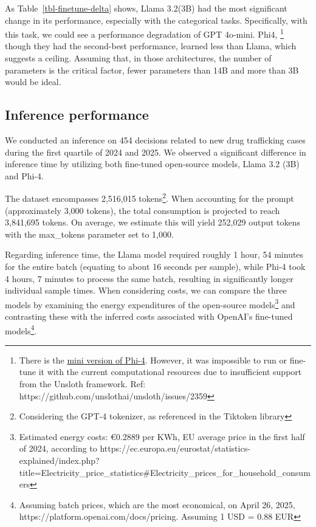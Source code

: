 \documentclass[
  12pt,
]{article}
\begin{document}
As Table~\ref{tbl-finetune-delta} shows, Llama 3.2(3B) had the most
significant change in its performance, especially with the categorical
tasks. Specifically, with this task, we could see a performance
degradation of GPT 4o-mini. Phi4, \footnote{There is the
  \href{https://huggingface.co/microsoft/Phi-4-mini-instruct}{mini
  version of Phi-4}. However, it was impossible to run or fine-tune it
  with the current computational resources due to insufficient support
  from the Unsloth framework. Ref:
  https://github.com/unslothai/unsloth/issues/2359} though they had the
second-best performance, learned less than Llama, which suggests a
ceiling. Assuming that, in those architectures, the number of parameters
is the critical factor, fewer parameters than 14B and more than 3B would
be ideal.

\subsection{Inference performance}\label{inference-performance}

We conducted an inference on 454 decisions related to new drug
trafficking cases during the first quartile of 2024 and 2025. We
observed a significant difference in inference time by utilizing both
fine-tuned open-source models, Llama 3.2 (3B) and Phi-4.

The dataset encompasses 2,516,015 tokens\footnote{Considering the GPT-4
  tokenizer, as referenced in the Tiktoken library}. When accounting for
the prompt (approximately 3,000 tokens), the total consumption is
projected to reach 3,841,695 tokens. On average, we estimate this will
yield 252,029 output tokens with the max\_tokens parameter set to 1,000.

Regarding inference time, the Llama model required roughly 1 hour, 54
minutes for the entire batch (equating to about 16 seconds per sample),
while Phi-4 took 4 hours, 7 minutes to process the same batch, resulting
in significantly longer individual sample times. When considering costs,
we can compare the three models by examining the energy expenditures of
the open-source models\footnote{Estimated energy costs: €0.2889 per KWh,
  EU average price in the first half of 2024, according to
  https://ec.europa.eu/eurostat/statistics-explained/index.php?title=Electricity\_price\_statistics\#Electricity\_prices\_for\_household\_consumers}
and contrasting these with the inferred costs associated with OpenAI's
fine-tuned models\footnote{Assuming batch prices, which are the most
  economical, on April 26, 2025,
  https://platform.openai.com/docs/pricing. Assuming 1 USD = 0.88 EUR}.
\end{document}
